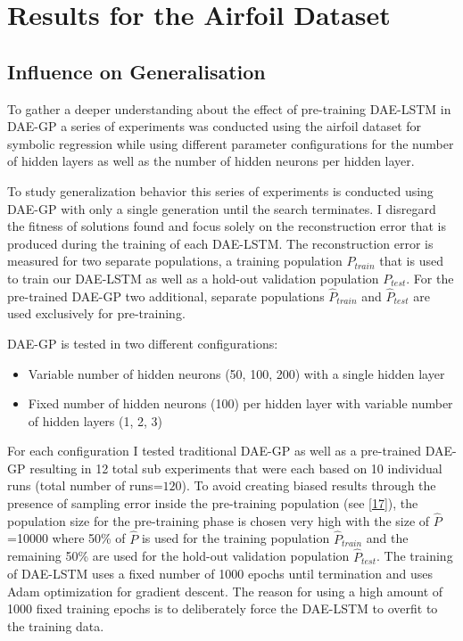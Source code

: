 \documentclass[
  11pt,
]{article}
\providecommand{\tightlist}{%
  \setlength{\itemsep}{0pt}\setlength{\parskip}{0pt}}
\begin{document}
\hypertarget{results-for-the-airfoil-dataset}{%
\section{Results for the Airfoil Dataset}\label{results-for-the-airfoil-dataset}}

\hypertarget{influence-on-generalisation}{%
\subsection{Influence on Generalisation}\label{influence-on-generalisation}}

To gather a deeper understanding about the effect of pre-training DAE-LSTM in DAE-GP a series of experiments was conducted using the airfoil dataset for symbolic regression while using different parameter configurations for the number of hidden layers as well as the number of hidden neurons per hidden layer.

To study generalization behavior this series of experiments is conducted using DAE-GP with only a single generation until the search terminates. I disregard the fitness of solutions found and focus solely on the reconstruction error that is produced during the training of each DAE-LSTM. The reconstruction error is measured for two separate populations, a training population \(P_{train}\) that is used to train our DAE-LSTM as well as a hold-out validation population \(P_{test}\). For the pre-trained DAE-GP two additional, separate populations \(\hat{P}_{train}\) and \(\hat{P}_{test}\) are used exclusively for pre-training.

DAE-GP is tested in two different configurations:

\begin{itemize}
\tightlist
\item
  Variable number of hidden neurons (50, 100, 200) with a single hidden layer
\item
  Fixed number of hidden neurons (100) per hidden layer with variable number of hidden layers (1, 2, 3)
\end{itemize}

For each configuration I tested traditional DAE-GP as well as a pre-trained DAE-GP resulting in 12 total sub experiments that were each based on 10 individual runs (total number of runs=\(120\)). To avoid creating biased results through the presence of sampling error inside the pre-training population (see {[}\protect\hyperlink{ref-sampling_err_gp}{17}{]}), the population size for the pre-training phase is chosen very high with the size of \(\hat{P}\) =10000 where 50\% of \(\hat{P}\) is used for the training population \(\hat{P}_{train}\) and the remaining 50\% are used for the hold-out validation population \(\hat{P}_{test}\). The training of DAE-LSTM uses a fixed number of 1000 epochs until termination and uses Adam optimization for gradient descent. The reason for using a high amount of 1000 fixed training epochs is to deliberately force the DAE-LSTM to overfit to the training data.
\end{document}
